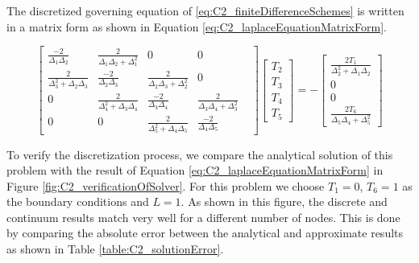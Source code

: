 The discretized governing equation of \eqref{eq:C2_finiteDifferenceSchemes} is written in a matrix form as shown in Equation \eqref{eq:C2_laplaceEquationMatrixForm}.

\begin{equation}\label{eq:C2_laplaceEquationMatrixForm}
    \begin{bmatrix}
        \frac{-2}{\Delta_{1} \Delta_{2}} &
        \frac{2}{\Delta_{1} \Delta_{2} + \Delta_{1}^2} &
        0 &
        0 &
        \\
        \frac{2}{\Delta_{3}^2 + \Delta_{2} \Delta_{3}} & 
        \frac{-2}{\Delta_{2} \Delta_{3}} &
        \frac{2}{\Delta_{2} \Delta_{3} + \Delta_{2}^2} &
        0
        \\
        0 &
        \frac{2}{\Delta_{4}^2 + \Delta_{3} \Delta_{4}} & 
        \frac{-2}{\Delta_{3} \Delta_{4}} &
        \frac{2}{\Delta_{3} \Delta_{4} + \Delta_{3}^2} &
        \\
        0 &
        0 &
        \frac{2}{\Delta_{5}^2 + \Delta_{4} \Delta_{5}} & 
        \frac{-2}{\Delta_{4} \Delta_{5}}
    \end{bmatrix}
    \begin{bmatrix}
        T_2 \\
        T_3 \\
        T_4 \\
        T_5
    \end{bmatrix}
    =
    -\begin{bmatrix}
         \frac{2T_1}{\Delta_{2}^2 + \Delta_{1} \Delta_{2}} \\
         0 \\
        0 \\
        \frac{2T_6}{\Delta_{5} \Delta_{4} + \Delta_{5}^2}
    \end{bmatrix}
\end{equation}

To verify the discretization process, we compare the analytical solution of this problem with the result of Equation \eqref{eq:C2_laplaceEquationMatrixForm} in Figure \ref{fig:C2_verificationOfSolver}. For this problem we choose $T_1 = 0$, $T_6 = 1$ as the boundary conditions and $L = 1$.  As shown in this figure, the discrete and continuum results match very well for a different number of nodes. This is done by comparing the absolute error between the analytical and approximate results as shown in Table \ref{table:C2_solutionError}.

